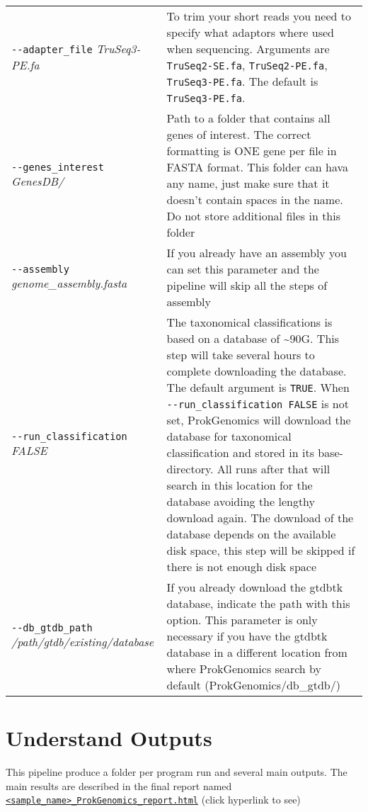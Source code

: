 \documentclass[
]{book}
\begin{document}
\begin{longtable}[]{@{}
  >{\raggedright\arraybackslash}p{}
  >{\raggedright\arraybackslash}p{}@{}}
\texttt{-\/-adapter\_file} \emph{TruSeq3-PE.fa} & To trim your short reads you need to specify what adaptors where used when sequencing. Arguments are \texttt{TruSeq2-SE.fa}, \texttt{TruSeq2-PE.fa}, \texttt{TruSeq3-PE.fa}. The default is \texttt{TruSeq3-PE.fa}. \\
\texttt{-\/-genes\_interest} \emph{GenesDB/} & Path to a folder that contains all genes of interest. The correct formatting is ONE gene per file in FASTA format. This folder can hava any name, just make sure that it doesn't contain spaces in the name. Do not store additional files in this folder \\
\texttt{-\/-assembly} \emph{genome\_assembly.fasta} & If you already have an assembly you can set this parameter and the pipeline will skip all the steps of assembly \\
\texttt{-\/-run\_classification} \emph{FALSE} & The taxonomical classifications is based on a database of \textasciitilde90G. This step will take several hours to complete downloading the database. The default argument is \texttt{TRUE}. When \texttt{-\/-run\_classification\ FALSE} is not set, ProkGenomics will download the database for taxonomical classification and stored in its base-directory. All runs after that will search in this location for the database avoiding the lengthy download again. The download of the database depends on the available disk space, this step will be skipped if there is not enough disk space \\
\texttt{-\/-db\_gtdb\_path} \emph{/path/gtdb/existing/database} & If you already download the gtdbtk database, indicate the path with this option. This parameter is only necessary if you have the gtdbtk database in a different location from where ProkGenomics search by default (ProkGenomics/db\_gtdb/) \\
\end{longtable}

\hypertarget{understand-outputs}{%
\chapter{Understand Outputs}\label{understand-outputs}}

This pipeline produce a folder per program run and several main outputs. The main results are described in the final report named \href{https://bioinformatics.erc.monash.edu/home/lper0012/ProkGenomics/1-77321-LFA6246_L2_ProkGenomics_report.html}{\texttt{\textless{}sample\_name\textgreater{}\_ProkGenomics\_report.html}} (click hyperlink to see)
\end{document}
